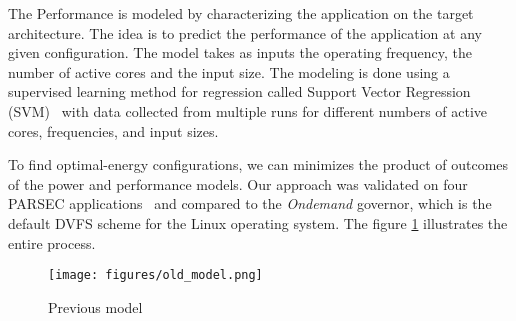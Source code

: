 The Performance is modeled by characterizing the application on the target architecture. The idea is to predict the performance of the application at any given configuration. The model takes as inputs the operating frequency, the number of active cores and the input size. The modeling is done using a supervised learning method for regression called Support Vector Regression (SVM)~\cite{Ventura2009, Smola2004} with data collected from multiple runs for different numbers of active cores, frequencies, and input sizes.

To find optimal-energy configurations, we can minimizes the product of outcomes of the power and performance models. Our approach was validated on four PARSEC applications~\cite{Bienia2008} and compared to the \emph{Ondemand} governor, which is the default DVFS scheme for the Linux operating system. The figure \ref{fig:previous_model} illustrates the entire process.

\begin{figure}[h]
    \centering
    \texttt{[image: figures/old\_model.png]}
    \caption{Previous model}
    \label{fig:previous_model}
\end{figure}





